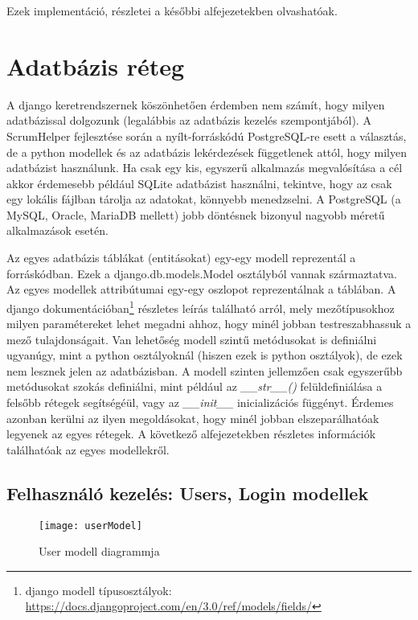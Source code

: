 Ezek implementáció, részletei a későbbi alfejezetekben olvashatóak. 

\section{Adatbázis réteg}
\label{dbmodels}

A django keretrendszernek köszönhetően érdemben nem számít, hogy milyen adatbázissal dolgozunk (legalábbis az adatbázis kezelés szempontjából). A ScrumHelper fejlesztése során a nyílt-forráskódú PostgreSQL-re esett a választás, de a python modellek és az adatbázis lekérdezések függetlenek attól, hogy milyen adatbázist használunk. Ha csak egy kis, egyszerű alkalmazás megvalósítása a cél akkor érdemesebb például SQLite adatbázist használni, tekintve, hogy az csak egy lokális fájlban tárolja az adatokat, könnyebb menedzselni. A PostgreSQL (a MySQL, Oracle, MariaDB mellett) jobb döntésnek bizonyul nagyobb méretű alkalmazások esetén. 

Az egyes adatbázis táblákat (entitásokat) egy-egy modell reprezentál a forráskódban. Ezek a django.db.models.Model osztályból vannak származtatva. Az egyes modellek attribútumai egy-egy oszlopot reprezentálnak a táblában. A django dokumentációban\footnote{django modell típusosztályok: \url{https://docs.djangoproject.com/en/3.0/ref/models/fields/}} részletes leírás található arról, mely mezőtípusokhoz milyen paramétereket lehet megadni ahhoz, hogy minél jobban testreszabhassuk a mező tulajdonságait. Van lehetőség modell szintű metódusokat is definiálni ugyanúgy, mint a python osztályoknál (hiszen ezek is python osztályok), de ezek nem lesznek jelen az adatbázisban. A modell szinten jellemzően csak egyszerűbb metódusokat szokás definiálni, mint például az \textit{\_\_str\_\_()} felüldefiniálása a felsőbb rétegek segítségéül, vagy az \textit{\_\_init\_\_} inicializációs függényt. Érdemes azonban kerülni az ilyen megoldásokat, hogy minél jobban elszeparálhatóak legyenek az egyes rétegek.  A következő alfejezetekben részletes információk találhatóak az egyes modellekről.

\subsection{Felhasználó kezelés: Users, Login modellek}

\begin{figure}[H]
	\centering
	\texttt{[image: userModel]}
	\caption{User modell diagrammja}
	\label{fig:usermodel}
\end{figure}

